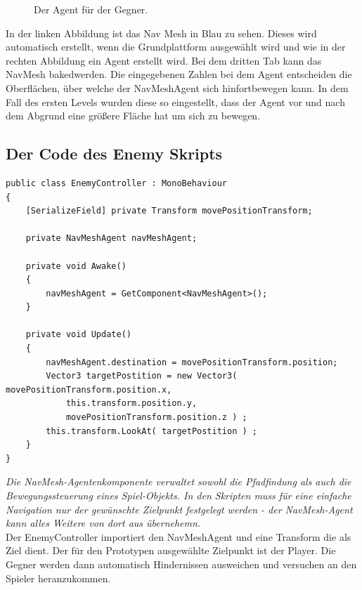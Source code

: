 \begin{figure}[h]
\begin{minipage}[b]{0.45\textwidth}
        \caption{Der Agent für der Gegner.}
        \label{fig:PE0SD022}
    \end{minipage}
\end{figure}

In der linken Abbildung ist das Nav Mesh in Blau zu sehen. Dieses wird automatisch erstellt, wenn die Grundplattform ausgewählt wird und wie in der rechten Abbildung ein Agent erstellt wird. Bei dem dritten Tab kann das NavMesh \glqq baked\grqq \space werden. Die eingegebenen Zahlen bei dem Agent entscheiden die Oberflächen, über welche der NavMeshAgent sich hinfortbewegen kann. In dem Fall des ersten Levels wurden diese so eingestellt, dass der Agent vor und nach dem Abgrund eine größere Fläche hat um sich zu bewegen. 


\pagebreak
\subsection{Der Code des Enemy Skripts}
\begin{lstlisting}[language=CSharp,caption={EnemyController Klasse.},label=code:enemyController]
public class EnemyController : MonoBehaviour
{
    [SerializeField] private Transform movePositionTransform;

    private NavMeshAgent navMeshAgent;

    private void Awake()
    {
        navMeshAgent = GetComponent<NavMeshAgent>();
    }
    
    private void Update()
    {
        navMeshAgent.destination = movePositionTransform.position;
        Vector3 targetPostition = new Vector3( movePositionTransform.position.x, 
            this.transform.position.y, 
            movePositionTransform.position.z ) ;
        this.transform.LookAt( targetPostition ) ;
    }
}
\end{lstlisting}

\emph{\glqq Die NavMesh-Agentenkomponente verwaltet sowohl die Pfadfindung als auch die Bewegungssteuerung eines Spiel-Objekts. In den Skripten muss für eine einfache Navigation nur der gewünschte Zielpunkt festgelegt werden - der NavMesh-Agent kann alles Weitere von dort aus übernehemn.\grqq}~\cite[Unity NavMesh Dokumentation]{unitydocNavmesh} \\

Der EnemyController importiert den NavMeshAgent und eine Transform die als Ziel dient. Der für den Prototypen ausgewählte Zielpunkt ist der Player. Die Gegner werden dann automatisch Hindernissen ausweichen und versuchen an den Spieler heranzukommen. 


